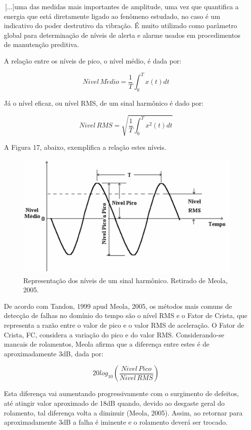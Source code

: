 \documentclass[
	12pt,				
	oneside,			
	a4paper,			
	english,			
	brazil				
	]{abntex2ppgsi}
\begin{document}
\begin{citacao}
\,[...]uma das medidas mais importantes de amplitude, uma vez que quantifica a energia que está diretamente ligado ao fenômeno estudado, no caso é um indicativo do poder destrutivo da vibração. É muito utilizado como parâmetro global para determinação de níveis de alerta e alarme usados em procedimentos de manutenção preditiva.
\end{citacao}

A relação entre os níveis de pico, o nível médio, é dada por:

\[Nivel \, M\acute{e}dio = \frac{1}{T} \int_{0}^{T} x(t)dt \]

Já o nível eficaz, ou nível RMS, de um sinal harmônico é dado por:

\[Nivel \, RMS = \sqrt{ \frac{1}{T} \int_{0}^{T} x^{2}(t)dt }  \]

A Figura 17, abaixo, exemplifica a relação estes níveis.

\begin{figure}[!htb]
\centering
\includegraphics{Figura17}
\caption {Representação dos níveis de um sinal harmônico. Retirado de Meola, 2005.}
\label{Figura17}
\end{figure}

De acordo com Tandon, 1999 apud Meola, 2005, os métodos mais comuns de detecção de falhas no domínio do tempo são o nível RMS e o Fator de Crista, que representa a razão entre o valor de pico e o valor RMS de aceleração. O Fator de Crista, FC, considera a variação do pico e do valor RMS. Considerando-se mancais de rolamentos, Meola afirma que a diferença entre estes é de aproximadamente 3dB, dada por:

\[20log_{10} \left ( \frac{Nivel \,Pico}{Nivel \, RMS} \right ) \]

Esta diferença vai aumentando progressivamente com o surgimento de defeitos, até atingir valor aproximado de 18dB quando, devido ao desgaste geral do rolamento, tal diferença volta a diminuir (Meola, 2005). Assim, ao retornar para aproximadamente 3dB a falha é iminente e o rolamento deverá ser trocado. 
\end{document}

